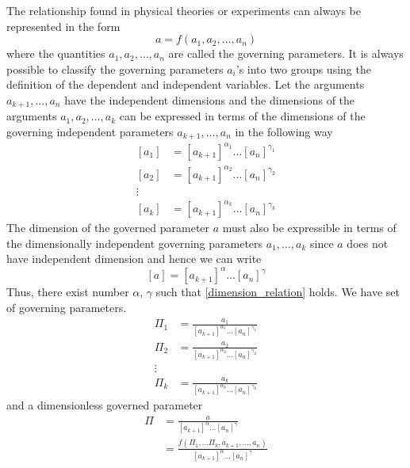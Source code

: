 The relationship found in physical theories or experiments can always be represented in the form
\begin{equation}
a = f (a_1, a_2, \ldots, a_n)
\label{def:governed_governing}
\end{equation}
where the quantities $a_1, a_2, \ldots, a_n$ are called the governing parameters. It is always possible to classify the governing parameters $a_i$'s into two groups using the definition of the dependent and independent variables. Let the arguments $a_{k+1},\ldots,a_n$ have the independent dimensions and the dimensions of the arguments $a_1, a_2, \ldots, a_k$ can be expressed in terms of the dimensions of the governing independent parameters $a_{k+1}, \ldots, a_n$ in the following way
\begin{align}
	\left[a_1\right] &= \left[a_{k+1}\right]^{\alpha_1} 
	\ldots \left[a_n\right]^{\gamma_1} \nonumber\\
	\left[a_2\right] &= \left[a_{k+1}\right]^{\alpha_2} \ldots \left[a_n\right]^{\gamma_2}\\
	\vdots \\
	\left[a_k\right] &= \left[a_{k+1}\right]^{\alpha_k} \ldots \left[a_n\right]^{\gamma_k} \nonumber
\end{align}
The dimension of the governed parameter $a$ must also be expressible in terms of the dimensionally independent governing parameters $a_1, \ldots, a_k$ since $a$ does not have independent dimension and hence we can write
\begin{equation}
	\left[a\right] = \left[a_{k+1}\right]^{\alpha} \ldots \left[a_n\right]^{\gamma}
	\label{dimension_relation}
\end{equation}
Thus, there exist number $\alpha$, $\gamma$ such that \ref{dimension_relation} holds. We have set of governing parameters.
\begin{align}
	\Pi_1 &= \frac{a_1}{\left[a_{k+1}\right]^{\alpha_1} \ldots \left[a_{n}\right]^{\gamma_1}} \\
	\Pi_2 &= \frac{a_2}{\left[a_{k+1}\right]^{\alpha_2} \ldots \left[a_{n}\right]^{\gamma_2}} \\
	\vdots \\
	\Pi_k &= \frac{a_k}{\left[a_{k+1}\right]^{\alpha_k} \ldots \left[a_{n}\right]^{\gamma_k}}
\end{align}
and a dimensionless governed parameter
\begin{align}
\Pi 
&= \frac{a}{\left[a_{k+1}\right]^{\alpha} \ldots \left[a_n\right]^{\gamma}} \nonumber\\
&=\frac{f(\Pi_1, \ldots \Pi_k, a_{k+1}, \ldots, a_n)}{\left[a_{k+1}\right]^{\alpha} \ldots \left[a_n\right]^{\gamma}}
\label{dimensionless-pi-1}
\end{align}
